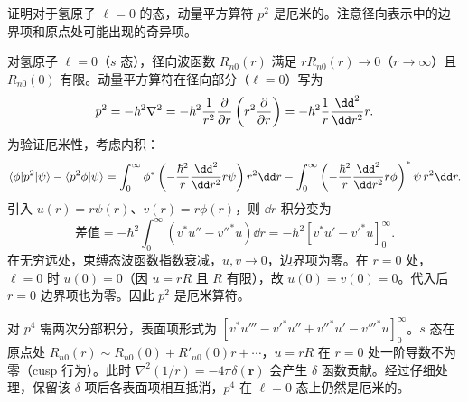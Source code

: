 \begin{question}
证明对于氢原子 $\ell=0$ 的态，动量平方算符 $p^2$ 是厄米的。注意径向表示中的边界项和原点处可能出现的奇异项。
\end{question}
\begin{solution}
对氢原子 $\ell=0$（$s$ 态），径向波函数 $R_{n0}(r)$ 满足 $rR_{n0}(r)\to0$（$r\to\infty$）且 $R_{n0}(0)$ 有限。动量平方算符在径向部分（$\ell=0$）写为
\[
p^2=-\hbar^2\nabla^2=-\hbar^2{1\over r^2}{\partial\over\partial r}\left(r^2{\partial\over\partial r}\right)
=-\hbar^2{1\over r}{\dd^2\over\dd r^2}r.
\]
为验证厄米性，考虑内积：
\[
\langle\phi|p^2|\psi\rangle-\langle p^2\phi|\psi\rangle
=\int_0^\infty\phi^*\left(-{\hbar^2\over r}{\dd^2\over\dd r^2}r\psi\right)r^2\dd r
-\int_0^\infty\left(-{\hbar^2\over r}{\dd^2\over\dd r^2}r\phi\right)^*\psi\,r^2\dd r.
\]
引入 $u(r)=r\psi(r)$、$v(r)=r\phi(r)$，则 $\dd r$ 积分变为
\[
\text{差值}=-\hbar^2\int_0^\infty\left(v^*u''-v''^*u\right)\dd r
=-\hbar^2\left[v^*u'-v'^*u\right]_0^\infty.
\]
在无穷远处，束缚态波函数指数衰减，$u,v\to0$，边界项为零。在 $r=0$ 处，$\ell=0$ 时 $u(0)=0$（因 $u=rR$ 且 $R$ 有限），故 $u(0)=v(0)=0$。代入后 $r=0$ 边界项也为零。因此 $p^2$ 是厄米算符。

对 $p^4$ 需两次分部积分，表面项形式为 $[v^*u'''-v'^*u''+v''^*u'-v'''^*u]_0^\infty$。$s$ 态在原点处 $R_{n0}(r)\sim R_{n0}(0)+R'_{n0}(0)r+\cdots$，$u=rR$ 在 $r=0$ 处一阶导数不为零（cusp 行为）。此时 $\nabla^2(1/r)=-4\pi\delta(\mathbf r)$ 会产生 $\delta$ 函数贡献。经过仔细处理，保留该 $\delta$ 项后各表面项相互抵消，$p^4$ 在 $\ell=0$ 态上仍然是厄米的。
\end{solution}

